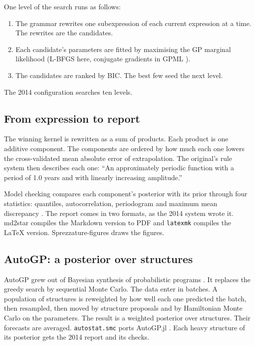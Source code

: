 \documentclass[
]{article}
\providecommand{\tightlist}{%
  \setlength{\itemsep}{0pt}\setlength{\parskip}{0pt}}
\begin{document}
One level of the search runs as follows:

\begin{enumerate}
\def\labelenumi{\arabic{enumi}.}
\tightlist
\item
  The grammar rewrites one subexpression of each current expression at a
  time. The rewrites are the candidates.
\item
  Each candidate's parameters are fitted by maximising the GP marginal
  likelihood (L-BFGS here, conjugate gradients in GPML
  \autocite{rasmussen2010gpmltoolbox}).
\item
  The candidates are ranked by BIC. The best few seed the next level.
\end{enumerate}

The 2014 configuration searches ten levels.

\subsection{From expression to report}\label{from-expression-to-report}

The winning kernel is rewritten as a sum of products. Each product is
one additive component. The components are ordered by how much each one
lowers the cross-validated mean absolute error of extrapolation. The
original's rule system then describes each one: ``An approximately
periodic function with a period of 1.0 years and with linearly
increasing amplitude.''

Model checking compares each component's posterior with its prior
through four statistics: quantiles, autocorrelation, periodogram and
maximum mean discrepancy
\autocite{gretton2012kernel,lloyd2015criticism}. The report comes in two
formats, as the 2014 system wrote it. md2star compiles the Markdown
version to PDF and \texttt{latexmk} compiles the LaTeX version.
Sprezzature-figures draws the figures.

\subsection{AutoGP: a posterior over
structures}\label{autogp-a-posterior-over-structures}

AutoGP \autocite{saad2023autogp} grew out of Bayesian synthesis of
probabilistic programs \autocite{saad2019bayesian}. It replaces the
greedy search by sequential Monte Carlo. The data enter in batches. A
population of structures is reweighted by how well each one predicted
the batch, then resampled, then moved by structure proposals and by
Hamiltonian Monte Carlo on the parameters. The result is a weighted
posterior over structures. Their forecasts are averaged.
\texttt{autostat.smc} ports AutoGP.jl \autocite{saad2023autogpjl}. Each
heavy structure of its posterior gets the 2014 report and its checks.
\end{document}

